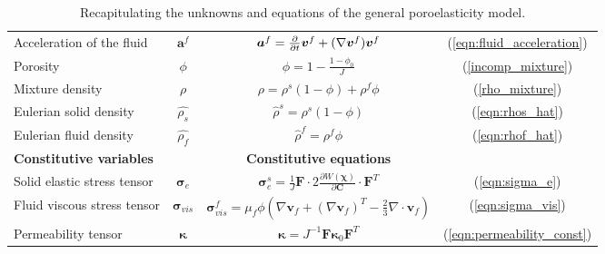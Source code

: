 \begin{table}[H]
\begin{center}
{\begin{tabular}{ l c  || c c }
Acceleration of the fluid  &  $\boldsymbol{a}^{f}$  & $ \boldsymbol{a}^{f}  = \frac{\partial }{\partial t}\boldsymbol{v}^{f} + (\nabla \boldsymbol{v}^{f})\boldsymbol{v}^{f}$ & (\ref{eqn:fluid_acceleration}) \\
Porosity &  $\phi$ & $ \phi = 1-\frac{1-\phi_{0}}{J}$ &  (\ref{incomp_mixture}) \\
Mixture density &  $\rho$ & $\rho=\rho^{s}(1-\phi)+\rho^{f}\phi$ & (\ref{rho_mixture})  \\
Eulerian solid density &  $\hat{\rho_s}$ & $\hat\rho^{s}=\rho^{s}(1-\phi)$ & (\ref{eqn:rhos_hat})  \\
Eulerian fluid density &  $\hat{\rho_f}$ & $\hat\rho^{f}=\rho^{f}\phi$ & (\ref{eqn:rhof_hat})  \\
\hline\bf{{Constitutive variables}}& &   \bf{{Constitutive equations}} & \\ \hline
Solid elastic stress tensor &  $\boldsymbol{\sigma}_{e}$ & $ \boldsymbol\sigma^{s}_{e}=\frac{1}{J}\boldsymbol{F}\cdot 2 \frac{\partial W(\boldsymbol\chi)}{\partial \boldsymbol{C}}  \cdot \boldsymbol{F}^{T}$ & (\ref{eqn:sigma_e}) \\
Fluid viscous stress tensor &  $\boldsymbol{\sigma}_{vis}$ & $\boldsymbol\sigma^{f}_{vis}= \mu_{f} \phi ( \nabla \boldsymbol{v}_f + (\nabla \boldsymbol{v}_f)^{T} - \frac{2}{3}\nabla \cdot\boldsymbol{v}_f)$ & (\ref{eqn:sigma_vis}) \\
Permeability tensor &  $\boldsymbol{\kappa}$& $ \boldsymbol{\kappa}=J^{-1} \boldsymbol{F} \boldsymbol{\kappa}_{0} \boldsymbol{F}^{T} $& (\ref{eqn:permeability_const})\\
\hline
\end{tabular}
}
\end{center}
\caption{Recapitulating the unknowns and equations of the general poroelasticity model.} 
\label{tab:recap_full_model}
\end{table}


\begin{comment}
\begin{table}[H]
\begin{center}
\scalebox{0.9}{
\begin{tabular}{ l c c }
\hline
\bf Parameters &    \\
\hline
Initial porosity &  $\phi_{0} $,  \\
Fluid dynamic viscosity  &  $\mu_{f}$,  \\
Solid density &  $\rho_s$  \\
Fluid density &  $\rho_f$ \\
Initial permeability &  $k_{0}$  \\
\hline
\bf Known functions &    \\
\hline
Reference position of solid &  $\boldsymbol{X}$  \\
Body force  &  $\boldsymbol{f}$ \\
Fluid source term &  $g$
\end{tabular}
}
\end{center}
\caption{Recapulating the parameters and known functions.} 
\label{tab:parameters}
\end{table}
\end{comment}

